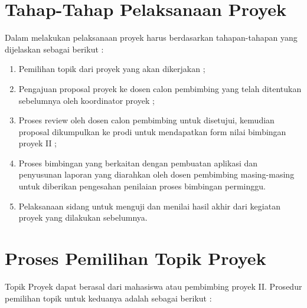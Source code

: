 \section{Tahap-Tahap Pelaksanaan Proyek}
Dalam melakukan pelaksanaan	proyek harus berdasarkan tahapan-tahapan	yang dijelaskan	sebagai	berikut	:
\begin{enumerate}
\item Pemilihan topik dari proyek yang akan dikerjakan ;

\item Pengajuan proposal proyek ke dosen calon pembimbing yang telah ditentukan sebelumnya oleh koordinator proyek ;

\item Proses review oleh dosen calon pembimbing	untuk disetujui, kemudian proposal dikumpulkan ke	prodi untuk	mendapatkan	form nilai	bimbingan proyek II ;

\item Proses bimbingan yang	berkaitan dengan pembuatan aplikasi	dan penyusunan laporan yang diarahkan oleh dosen pembimbing masing-masing	untuk diberikan pengesahan penilaian proses	bimbingan perminggu.

\item Pelaksanaan sidang untuk menguji dan menilai hasil akhir dari	 kegiatan proyek yang dilakukan sebelumnya.
\end{enumerate}

\section{Proses Pemilihan Topik Proyek}
Topik Proyek dapat berasal dari	mahasiswa atau pembimbing proyek II.	 Prosedur pemilihan topik untuk keduanya	adalah sebagai berikut :


